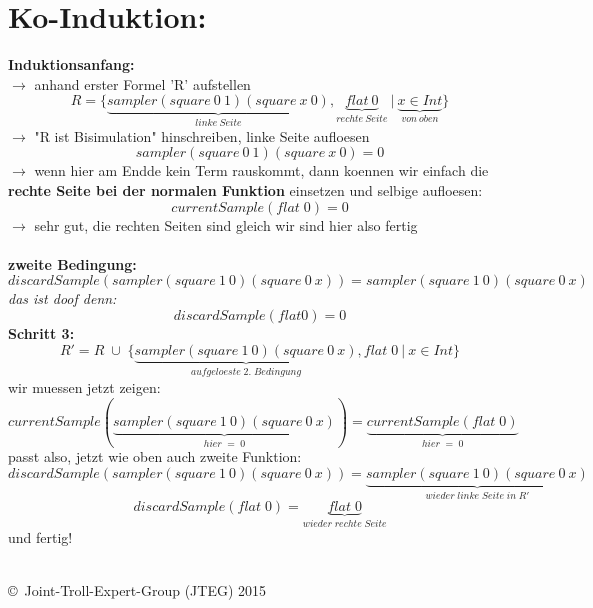 \documentclass{article}
\begin{document}
	\section{Ko-Induktion:}
	\textbf{Induktionsanfang:}\\
	$\rightarrow$ anhand erster Formel 'R' aufstellen
	\[ R = \{ \underbrace{sampler(square\:0\:1)(square\:x\:0)}_{linke\:Seite},\underbrace{flat\:0}_{rechte\:Seite} \:|\: \underbrace{x\in Int}_{von\:oben}\}\]
	$\rightarrow$ "R ist Bisimulation" hinschreiben, linke Seite aufloesen\\
	\[ sampler(square\:0\:1)(square\:x\:0) = 0 \]
	$\rightarrow$ wenn hier am Endde kein Term rauskommt, dann koennen wir einfach die \textbf{rechte Seite bei der normalen Funktion} einsetzen und selbige aufloesen:
	\[ currentSample(flat\;0) = 0 \]
	$\rightarrow$ sehr gut, die rechten Seiten sind gleich wir sind hier also fertig\\ \\
	\textbf{zweite Bedingung:}
		\[discardSample(sampler(square\:1\:0)(square\:0\:x)) = sampler(square\:1\:0)(square\:0\:x)\]
	\textit{das ist doof denn:}
		\[discardSample(flat 0) = 0\]
	\textbf{Schritt 3:}\\
	\[R' = R \;\cup\;\{\underbrace{sampler(square\:1\:0)(square\:0\:x)}_{aufgeloeste\;2.\;Bedingung},flat\;0\:|\:x\in Int\}\]	
	wir muessen jetzt zeigen:
	\[
		currentSample(\underbrace{sampler(square\:1\:0)(square\:0\:x)}_{hier\;=\;0}) = \underbrace{currentSample(flat\;0)}_{hier\;=\;0}
	\]
	passt also, jetzt wie oben auch zweite Funktion:
	\[
		discardSample(sampler(square\:1\:0)(square\:0\:x)) = \underbrace{sampler(square\:1\:0)(square\:0\:x)}_{wieder\;linke\;Seite\;in\;R'}\]\[
		discardSample(flat\;0) = \underbrace{flat\;0}_{wieder\;rechte\;Seite}
	\]
	und fertig!\\\\
	\begin{tiny}
	\copyright\ Joint-Troll-Expert-Group (JTEG) 2015
	\end{tiny}
	\newpage
	
	
	
	
	
	
	
	
	
	
	
	
	
	
	
	
\end{document}
